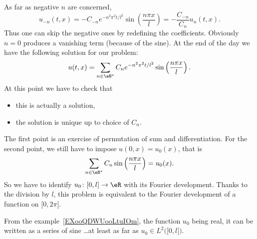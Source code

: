 As far as negative \( n\) are concerned,
\begin{equation}
    u_{-n}(t,x)=-C_{-n} e^{-n^2\pi^2 t/l^2}\sin\left( \frac{ n\pi x }{ l } \right)=-\frac{ C_{-n} }{C_n  }u_n(t,x).
\end{equation}
Thus one can skip the negative ones by redefining the coefficients. Obviously \( n=0\) produces a vanishing term (because of the sine). At the end of the day we have the following solution for our problem:
\begin{equation}
    u(t,x)=\sum_{n\in \eN^*}C_n e^{-n^2\pi^2 t/l^2}\sin\left( \frac{ n\pi x }{ l } \right).
\end{equation}
At this point we have to check that
\begin{itemize}
    \item this is actually a solution,
    \item the solution is unique up to choice of \( C_n\).
\end{itemize}
The first point is an exercise of permutation of sum and differentiation. For the second point, we still have to impose \( u(0,x)=u_0(x)\), that is
\begin{equation}
    \sum_{n\in \eN^*}C_n\sin\left( \frac{ n\pi x }{ l } \right)=u_0(x).
\end{equation}
So we have to identify \( u_0\colon  \mathopen[ 0 , l \mathclose]\to \eR \) with its Fourier development. Thanks to the division by \( l\), this problem is equivalent to the Fourier development of a function on \( \mathopen[ 0 , 2\pi \mathclose]\).

From the example~\ref{EXooQDWUooLtuIOm}, the function \( u_0\) being real, it can be written as a series of sine \ldots at least as far as \( u_0\in L^2\big( \mathopen[ 0 , l \mathclose] \big)\).
